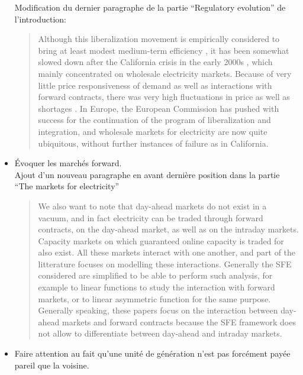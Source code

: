\documentclass{article}
\begin{document}
\begin{itemize}
Modification du dernier paragraphe de la partie ``Regulatory evolution'' de l'introduction:\\

\begin{quote}
Although this liberalization movement is empirically considered to bring at least modest medium-term efficiency \cite{fabrizio2007markets}, it has been somewhat slowed down after the California crisis in the early 2000s \cite{jamasb2005electricity}, which mainly concentrated on wholesale electricity markets. Because of very little price responsiveness of demand as well as interactions with forward contracts, there was very high fluctuations in price as well as shortages \cite{borenstein2002trouble}. In Europe, the European Commission has pushed with success for the continuation of the program of liberalization and integration, and wholesale markets for electricity are now quite ubiquitous, without further instances of failure as in California. 
\end{quote}

\item Évoquer les marchés forward.\\

Ajout d'un nouveau paragraphe en avant dernière position dans la partie ``The markets for electricity''

\begin{quote}
We also want to note that day-ahead markets do not exist in a vacuum, and in fact electricity can be traded through forward contracts, on the day-ahead market, as well as on the intraday markets. Capacity markets on which guaranteed online capacity is traded for also exist. All these markets interact with one another, and part of the litterature focuses on modelling these interactions. Generally the SFE considered are simplified to be able to perform such analysis, for example to linear functions \cite{green1999electricity} to study the interaction with forward markets, or to linear asymmetric function \cite{anderson2012asymmetric} for the same purpose. Generally speaking, these papers focus on the interaction between day-ahead markets and forward contracts because the SFE framework does not allow to differentiate between day-ahead and intraday markets. \\
\end{quote}

\item Faire attention au fait qu'une unité de génération n'est pas forcément payée pareil que la voisine. \\


\end{itemize}
\end{document}
